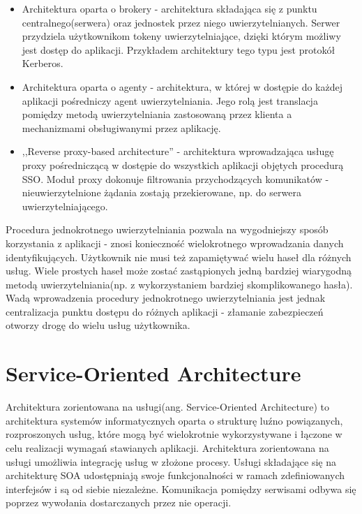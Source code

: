 		\begin{itemize}
		  \item Architektura oparta o brokery - architektura składająca się z punktu centralnego(serwera) oraz jednostek przez niego uwierzytelnianych. Serwer przydziela użytkownikom tokeny uwierzytelniające, dzięki którym możliwy jest dostęp do aplikacji. Przykładem architektury tego typu jest protokół Kerberos. 
		  \item Architektura oparta o agenty - architektura, w której w dostępie do każdej aplikacji pośredniczy agent uwierzytelniania. Jego rolą jest translacja pomiędzy metodą uwierzytelniania zastosowaną przez klienta a mechanizmami obsługiwanymi przez aplikację.
		  \item ,,Reverse proxy-based architecture'' - architektura wprowadzająca usługę proxy pośredniczącą w dostępie do wszystkich aplikacji objętych procedurą SSO. Moduł proxy dokonuje filtrowania przychodzących komunikatów - nieuwierzytelnione żądania zostają przekierowane, np. do serwera uwierzytelniającego.
		\end{itemize}
		  
		Procedura jednokrotnego uwierzytelniania pozwala na wygodniejszy sposób korzystania z aplikacji - znosi konieczność wielokrotnego wprowadzania danych identyfikujących. Użytkownik nie musi też zapamiętywać wielu haseł dla różnych usług. Wiele prostych haseł może zostać zastąpionych jedną bardziej wiarygodną metodą uwierzytelniania(np. z wykorzystaniem bardziej skomplikowanego hasła). Wadą wprowadzenia procedury jednokrotnego uwierzytelniania jest jednak centralizacja punktu dostępu do różnych aplikacji - złamanie zabezpieczeń otworzy drogę do wielu usług użytkownika.


\section{Service-Oriented Architecture}
\label{sec:soa}

	Architektura zorientowana na usługi(ang. Service-Oriented Architecture) to architektura systemów informatycznych oparta o strukturę luźno powiązanych, rozproszonych usług, które mogą być wielokrotnie wykorzystywane i łączone w celu realizacji wymagań stawianych aplikacji. Architektura zorientowana na usługi umożliwia integrację usług w złożone procesy\cite{Lawler08}. Usługi składające się na architekturę SOA udostępniają swoje  funkcjonalności w ramach zdefiniowanych interfejsów i są od siebie niezależne. Komunikacja pomiędzy serwisami odbywa się poprzez wywołania dostarczanych przez nie operacji\cite{Papazoglou07}. 

